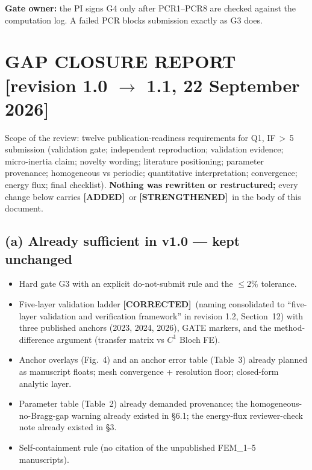 \documentclass[11pt,a4paper]{article}
\newcommand{\bp}[1]{\textcolor{accent}{\textsf{\footnotesize [#1]}}}
\newcommand{\ADDED}{{\color{addcol}\textbf{[ADDED]}}}
\newcommand{\STR}{{\color{strcol}\textbf{[STRENGTHENED]}}}
\newcommand{\COR}{{\color{corcol}\textbf{[CORRECTED]}}}
\begin{document}
\medskip
\textbf{Gate owner:} the PI signs G4 only after PCR1--PCR8 are checked against the
computation log. A failed PCR blocks submission exactly as G3 does.

\section{GAP CLOSURE REPORT \bp{revision 1.0 $\to$ 1.1, 22 September 2026}}
\label{sec:gcr}

Scope of the review: twelve publication-readiness requirements for Q1, IF\,$>$\,5
submission (validation gate; independent reproduction; validation evidence; micro-inertia
claim; novelty wording; literature positioning; parameter provenance; homogeneous vs
periodic; quantitative interpretation; convergence; energy flux; final checklist).
\textbf{Nothing was rewritten or restructured;} every change below carries \ADDED\ or
\STR\ in the body of this document.

\subsection*{(a) Already sufficient in v1.0 --- kept unchanged}
\begin{itemize}
\item Hard gate G3 with an explicit do-not-submit rule and the $\le2\%$ tolerance.
\item Five-layer validation ladder \COR\ (naming consolidated to ``five-layer validation and verification framework'' in revision 1.2, Section~12) with three published anchors (2023, 2024, 2026), GATE markers, and the method-difference argument (transfer matrix vs $C^1$ Bloch FE).
\item Anchor overlays (Fig.~4) and an anchor error table (Table~3) already planned as
manuscript floats; mesh convergence + resolution floor; closed-form analytic layer.
\item Parameter table (Table~2) already demanded provenance; the homogeneous-no-Bragg-gap
warning already existed in \S6.1; the energy-flux reviewer-check note already existed in \S3.
\item Self-containment rule (no citation of the unpublished FEM\_1--5 manuscripts).
\end{itemize}
\end{document}
